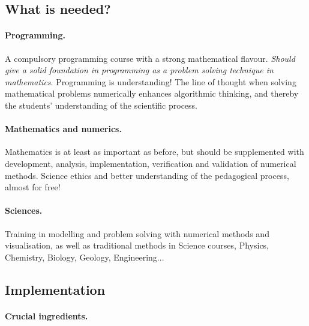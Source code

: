 \documentclass[%
twoside,                 %
final,                   %
10pt]{article}
\begin{document}
\noindent




\subsection{What is needed?}

\paragraph{Programming.}
A compulsory programming course with a strong mathematical flavour. \emph{Should give a solid foundation in programming as a problem solving technique in mathematics}. Programming is understanding! The line of thought when solving mathematical problems numerically enhances algorithmic thinking,  and thereby the students' understanding of the scientific process.




\paragraph{Mathematics and numerics.}
Mathematics is at least as important as before, but should be supplemented with development, analysis, implementation, verification and validation of numerical methods. Science ethics and better understanding of the pedagogical process, almost for free!




\paragraph{Sciences.}
Training in modelling and problem solving with numerical methods and visualisation, as well as traditional methods in Science courses, Physics, Chemistry, Biology, Geology, Engineering...





\subsection{Implementation}

\paragraph{Crucial ingredients.}
\end{document}
